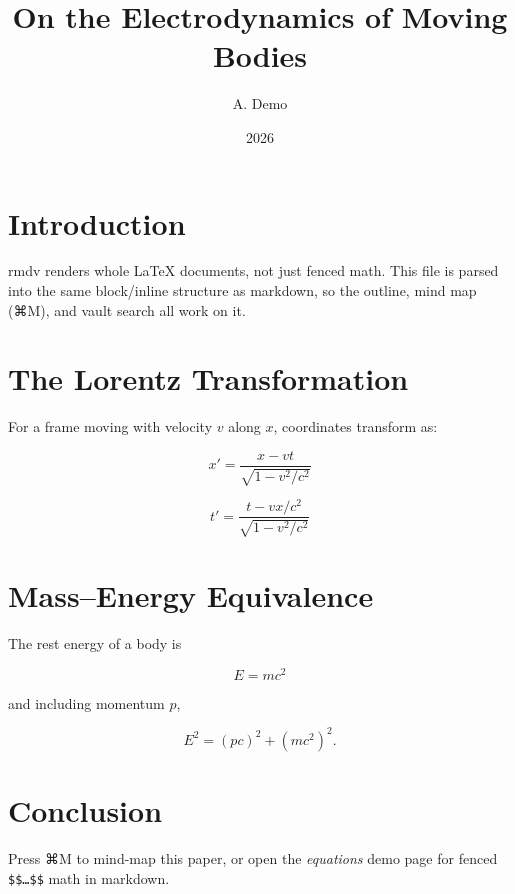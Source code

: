 \documentclass{article}
\title{On the Electrodynamics of Moving Bodies}
\author{A. Demo}
\date{2026}
\begin{document}
\maketitle

\section{Introduction}
rmdv renders whole \LaTeX{} documents, not just fenced math. This file is parsed
into the same block/inline structure as markdown, so the outline, mind map
(⌘M), and vault search all work on it.

\section{The Lorentz Transformation}
For a frame moving with velocity $v$ along $x$, coordinates transform as:

\begin{equation}
x' = \frac{x - vt}{\sqrt{1 - v^2/c^2}}
\end{equation}

\begin{equation}
t' = \frac{t - vx/c^2}{\sqrt{1 - v^2/c^2}}
\end{equation}

\section{Mass--Energy Equivalence}
The rest energy of a body is

\begin{equation}
E = mc^2
\end{equation}

and including momentum $p$,

\begin{equation}
E^2 = (pc)^2 + (mc^2)^2.
\end{equation}

\section{Conclusion}
Press ⌘M to mind-map this paper, or open the
\emph{equations} demo page for fenced \verb|$$…$$| math in markdown.
\end{document}
